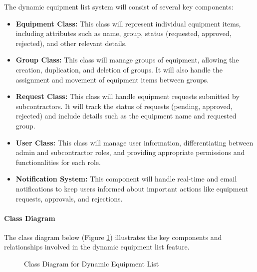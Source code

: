 The dynamic equipment list system will consist of several key components:

\begin{itemize}
    \item \textbf{Equipment Class:} This class will represent individual equipment items, including attributes such as name, group, status (requested, approved, rejected), and other relevant details.
    \item \textbf{Group Class:} This class will manage groups of equipment, allowing the creation, duplication, and deletion of groups. It will also handle the assignment and movement of equipment items between groups.
    \item \textbf{Request Class:} This class will handle equipment requests submitted by subcontractors. It will track the status of requests (pending, approved, rejected) and include details such as the equipment name and requested group.
    \item \textbf{User Class:} This class will manage user information, differentiating between admin and subcontractor roles, and providing appropriate permissions and functionalities for each role.
    \item \textbf{Notification System:} This component will handle real-time and email notifications to keep users informed about important actions like equipment requests, approvals, and rejections.
\end{itemize}
\paragraph{Class Diagram}
The class diagram below (Figure \ref{fig:class_diagram}) illustrates the key components and relationships involved in the dynamic equipment list feature.
\begin{figure}[H]
    \centering
    \caption{Class Diagram for Dynamic Equipment List}
    \label{fig:class_diagram}
\end{figure}


